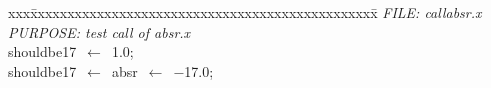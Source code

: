 \documentclass{report}
\begin{document}
\pagestyle{empty}
\begin{tabbing}
xxx\=xxxxxxxxxxxxxxxxxxxxxxxxxxxxxxxxxxxxxxxxxxxxxxx\=\kill
{\tt{}}{\em{} FILE:    callabsr.x
}\\
{\tt{}}{\em{} PURPOSE: test call of absr.x
}\\
shouldbe17\ $\leftarrow$\ 1.0;\>\\
shouldbe17\ $\leftarrow$\ absr\ $\leftarrow$\ $-$17.0;\\
\end{tabbing}
\end{document}
